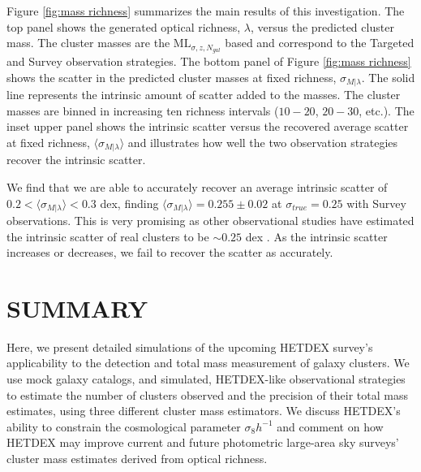 \documentclass[fleqn,usenatbib]{mnras}
\begin{document}
Figure \ref{fig:mass richness} summarizes the main results of this investigation. The top panel shows the generated optical richness, $\lambda$, versus the predicted cluster mass. The cluster masses are the $\mathrm{ML}_{\sigma, z, N_{gal}}$ based and correspond to the Targeted and Survey observation strategies. The bottom panel of Figure \ref{fig:mass richness} shows the scatter in the predicted cluster masses at fixed richness, $\sigma_{M|\lambda}$. The solid line represents the intrinsic amount of scatter added to the masses. The cluster masses are binned in increasing ten richness intervals ($10-20$, $20-30$, etc.). The inset upper panel shows the intrinsic scatter versus the recovered average scatter at fixed richness, $\langle \sigma_{M|\lambda} \rangle$ and illustrates how well the two observation strategies recover the intrinsic scatter. 

 We find that we are able to accurately recover an average intrinsic scatter of $0.2 <\langle \sigma_{M|\lambda} \rangle <0.3$ dex, finding $\langle \sigma_{M|\lambda} \rangle = 0.255\pm{0.02}$ at $\sigma_{true} = 0.25$ with Survey observations. This is very promising as other observational studies have estimated the intrinsic scatter of real clusters to be $\sim0.25$ dex . As the intrinsic scatter increases or decreases, we fail to recover the scatter as accurately.

\section{SUMMARY}\label{sec:summary}
Here, we present detailed simulations of the upcoming HETDEX survey's applicability to the detection and total mass measurement of galaxy clusters. We use mock galaxy catalogs, and simulated, HETDEX-like observational strategies to estimate the number of clusters observed and the precision of their total mass estimates, using three different cluster mass estimators. We discuss HETDEX's ability to constrain the cosmological parameter $\sigma_8 h^{-1}$ and comment on how HETDEX may improve current and future photometric large-area sky surveys' cluster mass estimates derived from optical richness.
\end{document}
